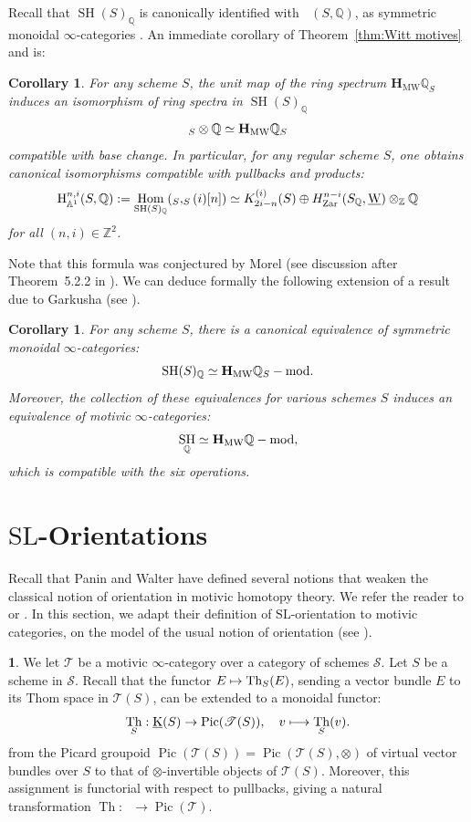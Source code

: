 \documentclass[11pt]{article}
\makeatletter
\numberwithin{equation}{section}\renewcommand{\encodingdefault}{TU}
\def\mto{\mathchoice{\longmapsto}{\mapsto}{\mapsto}{\mapsto}}
\DeclareRobustCommand{\mathbbm}[1]{\csname jepbb@#1\endcsname}
\newcommand{\modl}[1]{#1\textnormal{-}\mathrm{mod}}
\newcommand{\base}{\mathscr S}
\newcommand{\T}{\mathscr T}
\DeclareMathOperator{\uK}{\underline K}
\renewcommand{\AA}{\mathbb A}
\newcommand{\un}{\mathbbm 1}
\newcommand{\uW}{\underline{\mathrm W}}
\newcommand{\HMW}{\mathbf H_{\mathrm{MW}}}
\newcommand{\HA}{\mathrm H_{\AA^1}}
\newcommand{\SL}{\mathrm{SL}}
\DeclareMathOperator{\SH}{SH}
\DeclareMathOperator{\DA}{D_{\AA^1}}
\DeclareMathOperator{\Hom}{Hom}
\DeclareMathOperator{\Pic}{Pic}
\DeclareMathOperator{\Th}{Th}
\newcommand{\ZZ} {\mathbb Z}
\newcommand{\QQ} {\mathbb Q}
\newcommand{\zar}{\mathrm{Zar}}
\newtheorem{cor}[thm]{Corollary}
\theoremstyle{remark}
\theoremstyle{definition}
\newtheorem{num}[thm]{}
\numberwithin{equation}{thm}
\makeatother
\begin{document}
Recall that $\SH(S)_\QQ$ is canonically identified with $\DA(S,\QQ)$, as symmetric monoidal $\infty$-categories \cite[5.3.35]{CD3}.
An immediate corollary of Theorem~\ref{thm:Witt motives} and \cite[14.2.14]{CD3} is:
\begin{cor}\label{cor:rational_sphere&MW}
For any scheme $S$, the unit map of the ring spectrum $\HMW \QQ_S$ induces an isomorphism of ring spectra in $\SH(S)_\QQ$
\[
\un_S \otimes \QQ \simeq \HMW \QQ_S
\]
compatible with base change.
In particular, for any regular scheme $S$, one obtains canonical isomorphisms
compatible with pullbacks and products:
\[
\HA^{n,i}(S,\QQ):=\Hom_{\SH(S)_\QQ}(\un_S,\un_S(i)[n])
\simeq K_{2i-n}^{(i)}(S) \oplus H^{n-i}_\zar(S_\QQ,\uW) \otimes_\ZZ \QQ
\]
for all $(n,i)\in\ZZ^2$.
\end{cor}
Note that this formula was conjectured by Morel (see discussion after Theorem~5.2.2 in \cite{Morelpi0}).
We can deduce formally the following extension of a result due to Garkusha
(see \cite{Garkusha}).
\begin{cor}\label{cor:rational_SH&DMW}
For any scheme $S$, there is a canonical equivalence of symmetric monoidal $\infty$-categories:
\[
\SH(S)_\QQ \simeq \modl{\HMW \QQ_S}.
\]
Moreover, the collection of these equivalences for various schemes $S$
induces an equivalence of motivic $\infty$-categories:
\[
\SH_\QQ \simeq \modl{\HMW \QQ},
\]
which is compatible with the six operations.
\end{cor}

\section{\texorpdfstring{$\SL$}{SL}-Orientations}
\label{sec:SL}

Recall that Panin and Walter have defined several notions that weaken the classical notion of orientation in motivic homotopy theory. We refer the reader to \cite{AnaSL} or \cite[Def.\,2.1.3]{DF3}.
In this section, we adapt their definition of $\SL$-orientation to motivic categories, on the model of the usual notion of orientation (see \cite[2.4.38, 2.4.40]{CD3}).

\begin{num}
We let $\T$ be a motivic $\infty$-category over a category of schemes $\base$.
Let $S$ be a scheme in $\base$. Recall that the functor $E \mto \Th_S(E)$, sending a vector bundle $E$ to its Thom space in $\T(S)$, can be extended to a monoidal functor:
\[
\Th_S:\uK(S) \to \Pic(\T(S)),
\quad
v \mto \Th_S(v).
\]
from the Picard groupoid $\Pic(\T(S)) = \Pic(\T(S),\otimes)$ of virtual vector bundles over $S$ \cite{Del}
to that of $\otimes$-invertible objects of $\T(S)$.
Moreover, this assignment is functorial with respect to pullbacks,
giving a natural transformation $\Th:\uK \to \Pic(\T)$.
\end{num}
\end{document}
